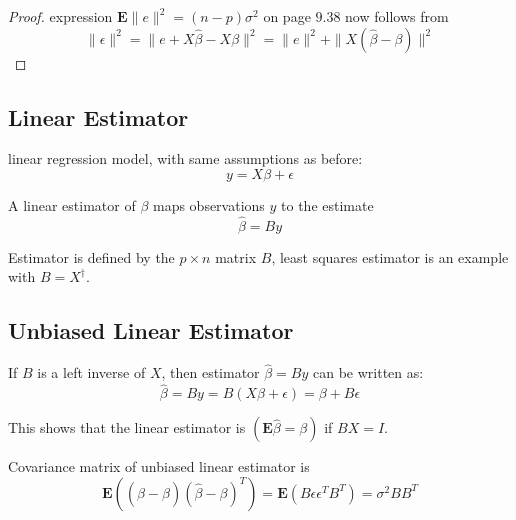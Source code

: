 \begin{proof}
expression $ \mathbf{E}\|e\|^{2}=(n-p) \sigma^{2} $ on page $ 9.38 $ now follows from
\begin{equation}
\|\epsilon\|^{2}=\|e+X \hat{\beta}-X \beta\|^{2}=\|e\|^{2}+\|X(\hat{\beta}-\beta)\|^{2}
\end{equation}
\end{proof}


\subsection{Linear Estimator}

\begin{problem}
    linear regression model, with same assumptions as before:
\begin{equation}
y=X \beta+\epsilon
\end{equation}
\end{problem}

\begin{definition}
    A linear estimator of $ \beta $ maps observations $ y $ to the estimate
\begin{equation}
\hat{\beta}=B y
\end{equation}

Estimator is defined by the $ p \times n $ matrix $ B $, least squares estimator is an example with $ B=X^{\dagger} $.
\end{definition}




\subsection{Unbiased Linear Estimator}

\begin{theorem}
    If $ B $ is a left inverse of $ X $, then estimator $ \hat{\beta}=B y $ can be written as:
\begin{equation}
\hat{\beta}=B y=B(X \beta+\epsilon)=\beta+B \epsilon
\end{equation}
\end{theorem}

\begin{corollary}
    This shows that the linear estimator is  $ (\mathbf{E} \hat{\beta}=\beta) $ if $ B X=I $.
\end{corollary}

\begin{theorem}
    Covariance matrix of unbiased linear estimator is
\begin{equation}
\mathbf{E}\left((\hat{\beta}-\beta)(\hat{\beta}-\beta)^{T}\right)=\mathbf{E}\left(B \epsilon \epsilon^{T} B^{T}\right)=\sigma^{2} B B^{T}
\end{equation}
\end{theorem}

